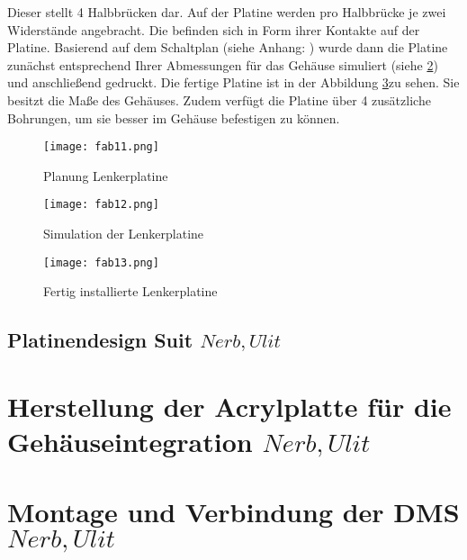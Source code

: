 Dieser stellt 4 Halbbrücken dar.
Auf der Platine werden pro Halbbrücke je zwei Widerstände angebracht. Die befinden sich in Form ihrer Kontakte auf der Platine.
Basierend auf dem Schaltplan (siehe Anhang: ) wurde dann die Platine zunächst entsprechend Ihrer Abmessungen für das Gehäuse simuliert (siehe \ref{fig:fab12}) und anschließend gedruckt. Die fertige Platine ist in der Abbildung \ref{fig:fab13}zu sehen. Sie besitzt die Maße des Gehäuses. Zudem verfügt die Platine über 4 zusätzliche Bohrungen, um sie besser im Gehäuse befestigen zu können. 
\begin{figure}[h]
    \begin{center}
        \texttt{[image: fab11.png]}
        \caption[Planung Lenkerplatine (Abbildungsverzeichnis)]{Planung Lenkerplatine}
        \label{fig:fab11}
    \end{center}
\end{figure}

\begin{figure}[h]
    \begin{center}
        \texttt{[image: fab12.png]}
        \caption[Simulation der Lenkerplatine (Abbildungsverzeichnis)]{Simulation der Lenkerplatine}
        \label{fig:fab12}
    \end{center}
\end{figure}

\begin{figure}[h]
    \begin{center}
        \texttt{[image: fab13.png]}
        \caption[Fertig installierte Lenkerplatine (Abbildungsverzeichnis)]{Fertig installierte Lenkerplatine}
        \label{fig:fab13}
    \end{center}
\end{figure}





\newpage{}

\subsection{Platinendesign Suit \(Nerb, Ulit\)}
\section{Herstellung der Acrylplatte f\"ur die Geh\"auseintegration \(Nerb, Ulit\)}
\section{Montage und Verbindung der DMS \(Nerb, Ulit\)}
